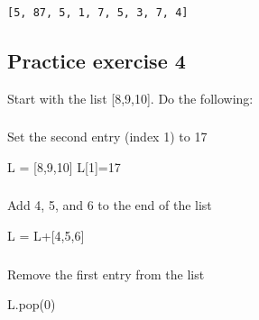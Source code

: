 \documentclass[
  letterpaper,
  DIV=11,
  numbers=noendperiod]{scrreprt}
\newenvironment{Shaded}{\begin{snugshade}}{\end{snugshade}}
\newcommand{\DecValTok}[1]{\textcolor[rgb]{0.68,0.00,0.00}{#1}}
\newcommand{\NormalTok}[1]{\textcolor[rgb]{0.00,0.23,0.31}{#1}}
\newcommand{\OperatorTok}[1]{\textcolor[rgb]{0.37,0.37,0.37}{#1}}
\begin{document}
\begin{verbatim}
[5, 87, 5, 1, 7, 5, 3, 7, 4]
\end{verbatim}

\hypertarget{practice-exercise-4-2}{%
\subsection{Practice exercise 4}\label{practice-exercise-4-2}}

Start with the list {[}8,9,10{]}. Do the following:

\hypertarget{section-7}{%
\subsubsection{}\label{section-7}}

Set the second entry (index 1) to 17

\begin{Shaded}
\begin{Highlighting}[]
\NormalTok{L }\OperatorTok{=}\NormalTok{ [}\DecValTok{8}\NormalTok{,}\DecValTok{9}\NormalTok{,}\DecValTok{10}\NormalTok{]}
\NormalTok{L[}\DecValTok{1}\NormalTok{]}\OperatorTok{=}\DecValTok{17}
\end{Highlighting}
\end{Shaded}

\hypertarget{section-8}{%
\subsubsection{}\label{section-8}}

Add 4, 5, and 6 to the end of the list

\begin{Shaded}
\begin{Highlighting}[]
\NormalTok{L }\OperatorTok{=}\NormalTok{ L}\OperatorTok{+}\NormalTok{[}\DecValTok{4}\NormalTok{,}\DecValTok{5}\NormalTok{,}\DecValTok{6}\NormalTok{]}
\end{Highlighting}
\end{Shaded}

\hypertarget{section-9}{%
\subsubsection{}\label{section-9}}

Remove the first entry from the list

\begin{Shaded}
\begin{Highlighting}[]
\NormalTok{L.pop(}\DecValTok{0}\NormalTok{)}
\end{Highlighting}
\end{Shaded}
\end{document}
